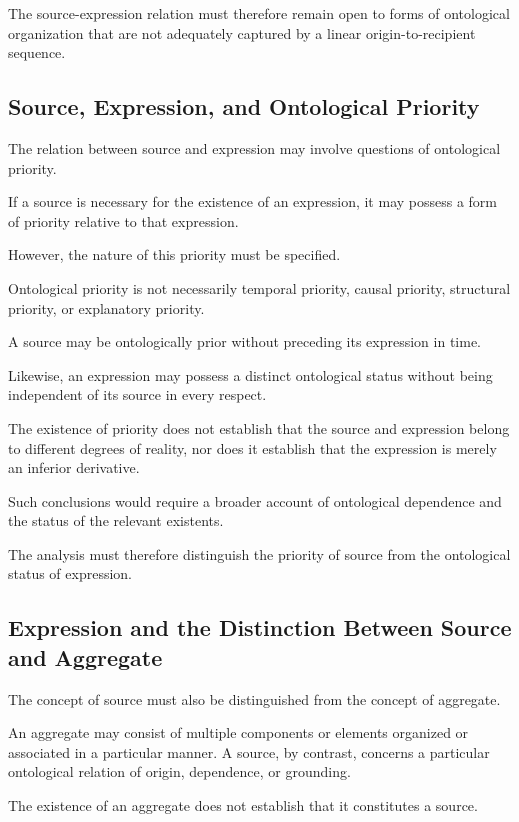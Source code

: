 The source-expression relation must therefore
remain open to forms of ontological organization
that are not adequately captured by a linear
origin-to-recipient sequence.

\subsection{Source, Expression, and Ontological Priority}

The relation between source and expression
may involve questions of ontological priority.

If a source is necessary for the existence
of an expression, it may possess a form of
priority relative to that expression.

However, the nature of this priority must
be specified.

Ontological priority is not necessarily temporal
priority, causal priority, structural priority,
or explanatory priority.

A source may be ontologically prior without
preceding its expression in time.

Likewise, an expression may possess a distinct
ontological status without being independent
of its source in every respect.

The existence of priority does not establish
that the source and expression belong to
different degrees of reality, nor does it
establish that the expression is merely
an inferior derivative.

Such conclusions would require a broader
account of ontological dependence and the
status of the relevant existents.

The analysis must therefore distinguish
the priority of source from the ontological
status of expression.

\subsection{Expression and the Distinction Between Source and Aggregate}

The concept of source must also be distinguished
from the concept of aggregate.

An aggregate may consist of multiple components
or elements organized or associated in a
particular manner. A source, by contrast,
concerns a particular ontological relation
of origin, dependence, or grounding.

The existence of an aggregate does not establish
that it constitutes a source.

